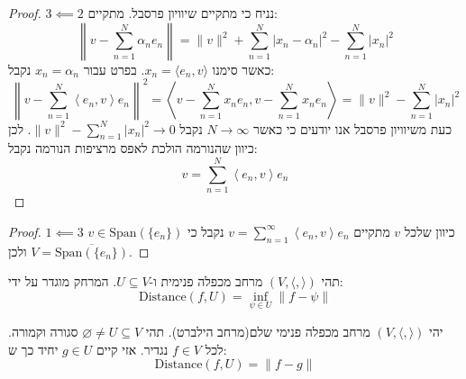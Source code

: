 \documentclass{tstextbook}
\begin{document}
\begin{proof}
\(3\impliedby 2\)
נניח כי מתקיים שיוויון פרסבל. מתקיים:
$$\left\lVert  v-\sum_{n=1}^{N} \alpha_{n}e_{n}  \right\rVert =\|v\|^{2}+\sum_{n=1}^{N}\left|x_{n}-\alpha_{n}\right|^{2}-\sum_{n=1}^{N}\left|x_{n}\right|^{2}$$
כאשר סימנו \(x_{n}=\langle e_{n},v \rangle\). בפרט עבור \(x_{n}=\alpha_{n}\) נקבל:
$$\left\|v-\sum_{n=1}^{N}\left\langle e_{n},v\right\rangle e_{n}\right\|^{2}=\left\langle v-\sum_{n=1}^{N}x_{n}e_{n},v-\sum_{n=1}^{N}x_{n}e_{n}\right\rangle=\lVert v \rVert^{2}-\sum_{n=1}^{N}\left|x_{n}\right|^{2}$$
כעת משיוויון פרסבל אנו יודעים כי כאשר \(N\to \infty\) נקבל \(\lVert v \rVert^{2}-\sum_{n=1}^{N}\left|x_{n}\right|^{2}\to 0\). לכן כיוון שהנורמה הולכת לאפס מרציפות הנורמה נקבל:
$$v=\sum_{n=1}^{N}\left\langle e_{n},v\right\rangle e_{n}$$

\end{proof}
\begin{proof}
\(1\impliedby 3\)
כיוון שלכל \(v\) מתקיים \(v=\sum_{n=1}^{\infty}\left\langle e_{n},v\right\rangle e_{n}\) נקבל כי \(v \in\text{Span}\left( \{ e_{n} \} \right)\) ולכן \(V=\overline{\text{Span}\left( \{ e_{n} \} \right)}\).

\end{proof}
\begin{definition}[מרחק]
תהי \((V,\langle , \rangle)\) מרחב מכפלה פנימית ו-\(U\subseteq V\). המרחק מוגדר על ידי:
$$\text{Distance}(f,U)=\inf_{\psi \in U} \lVert f-\psi \rVert $$

\end{definition}
\begin{proposition}
יהי \((V,\langle , \rangle)\) מרחב מכפלה פנימי שלם(מרחב הילברט). תהי \(\varnothing\neq U\subseteq V\) סגורה וקמורה. לכל \(f \in V\) נגדיר. אזי קיים \(g \in U\) יחיד כך ש:
$$\text{Distance}(f,U)=\lVert f-g \rVert $$

\end{proposition}
\end{document}

